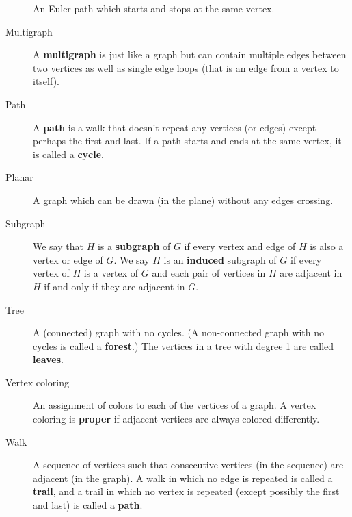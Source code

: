 \documentclass[10pt,]{book}
\newcommand{\terminology}[1]{\textbf{#1}}
\theoremstyle{plain}
\theoremstyle{definition}
\theoremstyle{definition}
\theoremstyle{definition}
\numberwithin{equation}{chapter}
\begin{document}
\begin{description}
 An Euler path which starts and stops at the same vertex.%
\item[{Multigraph}]\hypertarget{li-20}{}\hypertarget{p-118}{}%
 A \terminology{multigraph} is just like a graph but can contain multiple edges between two vertices as well as single edge loops (that is an edge from a vertex to itself).%
\item[{Path}]\hypertarget{li-21}{}\hypertarget{p-119}{}%
A \terminology{path} is a walk that doesn't repeat any vertices (or edges) except perhaps the first and last.  If a path starts and ends at the same vertex, it is called a \terminology{cycle}.%
\item[{Planar}]\hypertarget{li-22}{}\hypertarget{p-120}{}%
 A graph which can be drawn (in the plane) without any edges crossing.%
\item[{Subgraph}]\hypertarget{li-23}{}\hypertarget{p-121}{}%
 We say that \(H\) is a \terminology{subgraph} of \(G\) if every vertex and edge of \(H\) is also a vertex or edge of \(G\). We say \(H\) is an \terminology{induced} subgraph of \(G\) if every vertex of \(H\) is a vertex of \(G\) and each pair of vertices in \(H\) are adjacent in \(H\) if and only if they are adjacent in \(G\).%
\item[{Tree}]\hypertarget{li-24}{}\hypertarget{p-122}{}%
 A (connected) graph with no cycles. (A non-connected graph with no cycles is called a \terminology{forest}.) The vertices in a tree with degree 1 are called \terminology{leaves}.%
\item[{Vertex coloring}]\hypertarget{li-25}{}\hypertarget{p-123}{}%
 An assignment of colors to each of the vertices of a graph. A vertex coloring is \terminology{proper} if adjacent vertices are always colored differently.%
\item[{Walk}]\hypertarget{li-26}{}\hypertarget{p-124}{}%
 A sequence of vertices such that consecutive vertices (in the sequence) are adjacent (in the graph). A walk in which no edge is repeated is called a \terminology{trail}, and a trail in which no vertex is repeated (except possibly the first and last) is called a \terminology{path}.%
\end{description}
%
\typeout{************************************************}
\typeout{************************************************}
\end{document}
